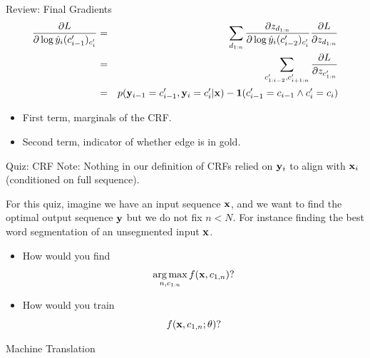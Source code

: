 \documentclass{beamer}
\begin{document}
 \begin{frame}{Review: Final Gradients}
   \begin{eqnarray*}
    \frac{\partial L}{\partial \log \hat{y}_i(c'_{i-1})_{c'_{i}}} &=&
    \sum_{d_{1:n}} \frac{\partial z_{d_{1:n}} }{\partial \log \hat{y}_i(c'_{i-2})_{c'_{i}}} \frac{\partial L } {\partial z_{d_{1:n}}}  \\
     &=& \sum_{c'_{1:i-2}, c'_{i+1:n}}  \frac{\partial L }{\partial z_{c'_{1:n}}}  \\
    &=& p(\mathbf{y}_{i-1} = c'_{i-1}, \mathbf{y}_{i} = c'_{i}  | \mathbf{x}) - \mathbf{1}(c'_{i-1} = c_{i-1} \land c'_{i} = c_i)
   \end{eqnarray*}

   \begin{itemize}
   \item First term, marginals of the CRF. 

     \air 

   \item Second term, indicator of whether edge is in gold.
   \end{itemize}
 \end{frame}


\begin{frame}{Quiz: CRF}
  Note: Nothing in our definition of CRFs relied on $\mathbf{y}_i$ to align
  with $\mathbf{x}_i$ (conditioned on full sequence). 

  For this quiz, imagine we have an input sequence $\mathbf{x}$, and we want to 
  find the optimal output sequence $\mathbf{y}$ but we do not fix $n < N$. For instance 
  finding the best word segmentation of an unsegmented input $\mathbf{x}$. 

  \begin{itemize}
  \item How would you find \[ \argmax_{n, c_{1:n}} f(\boldx, c_{1,n}) ?\]

  \item How would you train \[ f(\mathbf{x}, c_{1,n}; \theta) ?\] 
  \end{itemize}
\end{frame}

{

}

\begin{frame}{Machine Translation }
  \begin{center}
  \end{center}
\end{frame}
\end{document}
